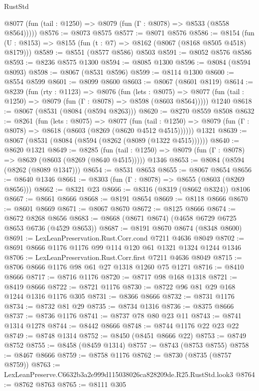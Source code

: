 \begin{lexlean}{RustStd}
\begin{coremodule}
      @8077 (fun (tail : @1250) => @8079 (fun (Γ : @8078) => @8533 (@8558 @8564)))))
@8576 := @8073 @8575
@8577 := @8071 @8576
@8586 := @8154 (fun (U : @8153) => @8155 (fun (t : @7) => @8162 (@8067 (@8168 @8505 @4518) @8179)))
@8589 := @8551 (@8577 @8586) @8503
@8591 := @8052 @8576 @8586
@8593 := @8236 @8575 @1300
@8594 := @8085 @1300
@8596 := @8084 (@8594 @8093)
@8598 := @8067 (@8531 @8596)
@8599 := @8114 @1300
@8600 := @8554 @8599
@8601 := @8099 @8600
@8603 := @8067 (@8601 @8119)
@8614 := @8239
    (fun (rty : @1123) =>
    @8076
      (fun (lets : @8075) =>
      @8077 (fun (tail : @1250) => @8079 (fun (Γ : @8078) => @8598 (@8603 @8564)))))
    @1240
@8618 := @8067 (@8531 (@8084 (@8594 @8263)))
@8620 := @8270 @8559 @8508
@8632 := @8261
    (fun (lets : @8075) =>
    @8077
      (fun (tail : @1250) => @8079 (fun (Γ : @8078) => @8618 (@8603 (@8269 (@8620 @4512 @4515))))))
    @1321
@8639 := @8067 (@8531 (@8084 (@8594 (@8262 (@8089 (@1322 @4515))))))
@8640 := @8620 @1321
@8649 := @8285
    (fun (tail : @1250) => @8079 (fun (Γ : @8078) => @8639 (@8603 (@8269 (@8640 @4515)))))
    @1346
@8653 := @8084 (@8594 (@8262 (@8089 @1347)))
@8654 := @8531 @8653
@8655 := @8067 @8654
@8656 := @8640 @1346
@8661 := @8303 (fun (Γ : @8078) => @8655 (@8603 (@8269 @8656)))
@8662 := @8321 @23
@8666 := @8316 (@8319 (@8662 @8324)) @8106
@8667 := @8661 @8666
@8668 := @8191 @8654
@8669 := @8118 @8666
@8670 := @8601 @8669
@8671 := @8067 @8670
@8672 := @8125 @8666
@8674 := @8672 @8268 @8656
@8683 := @8668 (@8671 @8674) (@4658 @6729 @6725 @8653 @6736 (@4529 @8653))
@8687 := @8191 @8670 @8674 (@8348 @8600)
@8691 := LexLeanPreservation.Rust.Corr.cond @7211 @4636 @8049
@8702 := @8691 @8666 @1176 @1176 @99 @114 @120 @61 @1321 @1324 @1244 @1346
@8706 := LexLeanPreservation.Rust.Corr.first @7211 @4636 @8049
@8715 := @8706 @8666 @1176 @98 @61 @27 @1318 @1260 @75 @1271
@8716 := @8410 @8666
@8717 := @8716 @1176
@8720 := @8717 @98 @168 @1318
@8721 := @8419 @8666
@8722 := @8721 @1176
@8730 := @8722 @96 @81 @29 @168 @1244 @1316 @1176 @305
@8731 := @8366 @8666
@8732 := @8731 @1176
@8734 := @8732 @81 @29
@8735 := @8734 @1316
@8736 := @8375 @8666
@8737 := @8736 @1176
@8741 := @8737 @78 @80 @23 @11
@8743 := @8741 @1314 @1278
@8744 := @8442 @8666
@8748 := @8744 @1176 @22 @23 @22
@8749 := @8748 @1314
@8752 := @8450 (@8451 @8666 @22)
@8753 := @8749 @8752
@8755 := @8458 (@8459 @1314)
@8757 := @8743 (@8753 @8755)
@8758 := @8467 @8666
@8759 := @8758 @1176
@8762 := @8730 (@8735 (@8757 @8759))
@8763 := LexLeanPreserve.C6632b3a2e999d115038026ca828209de.R25.RustStd.look3
@8764 := @8762 @8763
@8765 := @8111 @305

\end{coremodule}
\end{lexlean}

